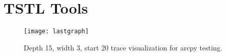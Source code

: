 \section{TSTL Tools}

\begin{figure}
\texttt{[image: lastgraph]}
\caption{Depth 15, width 3, start 20 trace visualization for arcpy testing.}
\end{figure}

